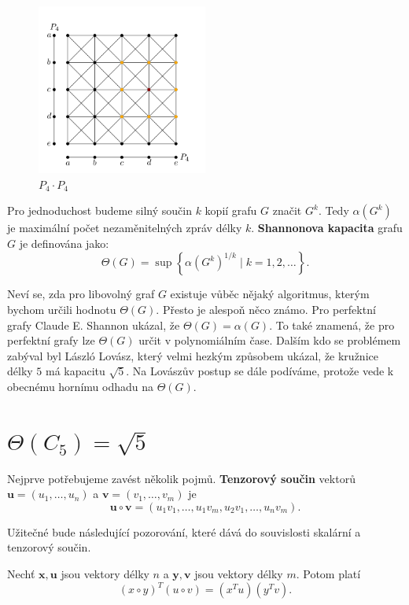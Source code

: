 \begin{figure}[h!]
    \centering
    \includegraphics[width=0.5\textwidth]{img/strong_product_P4_P4.png}   
    \caption{$P_4 \cdot P_4$}
    \label{fig:strong_product_P4_P4}
\end{figure}

Pro jednoduchost budeme silný součin $k$ kopií grafu $G$ značit $G^k$. Tedy $\alpha(G^k)$ je maximální počet nezaměnitelných zpráv délky $k$. \textbf{Shannonova kapacita} grafu $G$ je definována jako:
$$
    \Theta(G) = \sup \left\{ \alpha(G^k)^{1/k} \mid k = 1, 2, \dots \right\}.
$$

Neví se, zda pro libovolný graf $G$ existuje vůběc nějaký algoritmus, kterým bychom určili hodnotu $\Theta(G)$. Přesto je alespoň něco známo. Pro perfektní grafy Claude E. Shannon ukázal, že $\Theta(G) = \alpha(G)$. To také znamená, že pro perfektní grafy lze $\Theta(G)$ určit v polynomiálním čase. Dalším kdo se problémem zabýval byl László Lovász, který velmi hezkým způsobem ukázal, že kružnice délky $5$ má kapacitu $\sqrt{5}$. Na Lovászův postup se dále podíváme, protože vede k obecnému hornímu odhadu na $\Theta(G)$.

\section{$\Theta(C_5) = \sqrt{5}$}

Nejprve potřebujeme zavést několik pojmů. \textbf{Tenzorový součin} vektorů $\mathbf{u} = \left(u_1, \dots, u_n \right)$ a $\mathbf{v} = \left(v_1, \dots, v_m \right)$ je
$$
    \mathbf{u} \circ \mathbf{v} = \left( u_1 v_1, \dots, u_1 v_m, u_2 v_1, \dots, u_n v_m \right).
$$

Užitečné bude následující pozorování, které dává do souvislosti skalární a tenzorový součin.

\begin{pz}
    Nechť $\mathbf{x}, \mathbf{u}$ jsou vektory délky $n$ a $\mathbf{y}, \mathbf{v}$ jsou vektory délky $m$. Potom platí
    \begin{equation}
        \left( x \circ y \right)^T \left( u \circ v \right) = \left( x^T u \right) \left( y^T v \right).
        \label{eq:tensor_scalar_product}
    \end{equation}
\end{pz}

